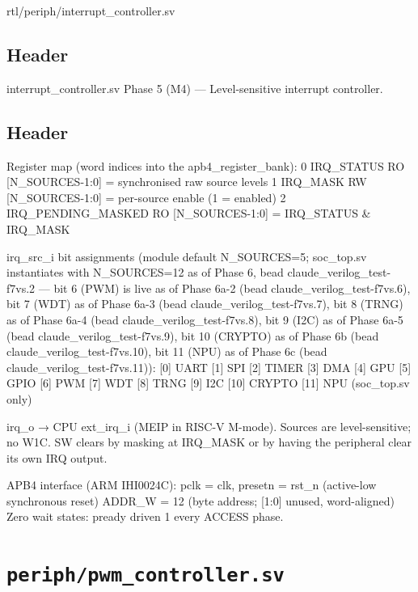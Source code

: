 \begin{relocated}{rtl/periph/interrupt_controller.sv}

\subsection*{Header}

\begin{textblock}
interrupt_controller.sv
Phase 5 (M4) — Level-sensitive interrupt controller.
\end{textblock}

\subsection*{Header}

\begin{textblock}
Register map (word indices into the apb4_register_bank):
  0  IRQ_STATUS        RO  [N_SOURCES-1:0] = synchronised raw source levels
  1  IRQ_MASK          RW  [N_SOURCES-1:0] = per-source enable (1 = enabled)
  2  IRQ_PENDING_MASKED RO  [N_SOURCES-1:0] = IRQ_STATUS & IRQ_MASK

irq_src_i bit assignments (module default N_SOURCES=5; soc_top.sv instantiates
with N_SOURCES=12 as of Phase 6, bead claude_verilog_test-f7vs.2 — bit 6 (PWM) is
live as of Phase 6a-2 (bead claude_verilog_test-f7vs.6), bit 7 (WDT) as of Phase 6a-3
(bead claude_verilog_test-f7vs.7), bit 8 (TRNG) as of Phase 6a-4
(bead claude_verilog_test-f7vs.8), bit 9 (I2C) as of Phase 6a-5 (bead
claude_verilog_test-f7vs.9), bit 10 (CRYPTO) as of Phase 6b (bead
claude_verilog_test-f7vs.10), bit 11 (NPU) as of Phase 6c (bead
claude_verilog_test-f7vs.11)):
  [0] UART  [1] SPI  [2] TIMER  [3] DMA  [4] GPU  [5] GPIO  [6] PWM  [7] WDT
  [8] TRNG  [9] I2C  [10] CRYPTO  [11] NPU  (soc_top.sv only)

irq_o → CPU ext_irq_i (MEIP in RISC-V M-mode).
Sources are level-sensitive; no W1C.  SW clears by masking at IRQ_MASK
or by having the peripheral clear its own IRQ output.

APB4 interface (ARM IHI0024C):
  pclk = clk, presetn = rst_n (active-low synchronous reset)
  ADDR_W = 12 (byte address; [1:0] unused, word-aligned)
  Zero wait states: pready driven 1 every ACCESS phase.
\end{textblock}

\end{relocated}

\section{\texttt{periph/pwm\_controller.sv}}\label{ds:mod:pwm-controller}

